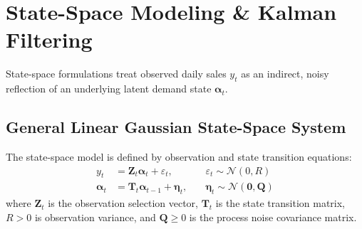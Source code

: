 \documentclass[conference]{IEEEtran}
\begin{document}
\section{State-Space Modeling \& Kalman Filtering}

State-space formulations treat observed daily sales $y_t$ as an indirect, noisy reflection of an underlying latent demand state $\boldsymbol{\alpha}_t$.

\subsection{General Linear Gaussian State-Space System}
The state-space model is defined by observation and state transition equations:
\begin{align}
y_t &= \mathbf{Z}_t \boldsymbol{\alpha}_t + \varepsilon_t, \quad &\varepsilon_t \sim \mathcal{N}(0, R) \label{eq:gen_obs} \\
\boldsymbol{\alpha}_t &= \mathbf{T}_t \boldsymbol{\alpha}_{t-1} + \boldsymbol{\eta}_t, \quad &\boldsymbol{\eta}_t \sim \mathcal{N}(\mathbf{0}, \mathbf{Q}) \label{eq:gen_state}
\end{align}
where $\mathbf{Z}_t$ is the observation selection vector, $\mathbf{T}_t$ is the state transition matrix, $R > 0$ is observation variance, and $\mathbf{Q} \ge 0$ is the process noise covariance matrix.
\end{document}

